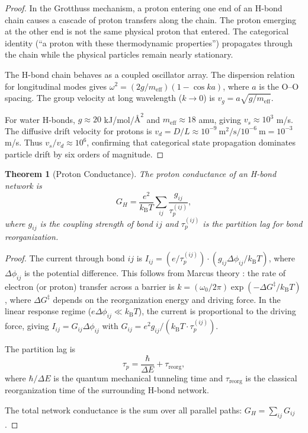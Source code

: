 \documentclass[twocolumn,10pt,a4paper]{article}
\newtheorem{theorem}{Theorem}[section]
\theoremstyle{definition}
\theoremstyle{remark}
\newcommand{\kB}{k_{\mathrm{B}}}
\newcommand{\taup}{\tau_p}
\begin{document}
\begin{proof}
In the Grotthuss mechanism, a proton entering one end of an H-bond chain causes a cascade of proton transfers along the chain. The proton emerging at the other end is not the same physical proton that entered. The categorical identity (``a proton with these thermodynamic properties'') propagates through the chain while the physical particles remain nearly stationary.

The H-bond chain behaves as a coupled oscillator array. The dispersion relation for longitudinal modes gives $\omega^2 = (2g/m_{\mathrm{eff}})(1 - \cos ka)$, where $a$ is the O--O spacing. The group velocity at long wavelength ($k \to 0$) is $v_g = a\sqrt{g/m_{\mathrm{eff}}}$.

For water H-bonds, $g \approx 20$ kJ/mol/$\text{\AA}^2$ and $m_{\mathrm{eff}} \approx 18$ amu, giving $v_s \approx 10^3$ m/s. The diffusive drift velocity for protons is $v_d = D/L \approx 10^{-9}~\mathrm{m}^2/\mathrm{s} / 10^{-6}~\mathrm{m} = 10^{-3}$ m/s. Thus $v_s/v_d \approx 10^6$, confirming that categorical state propagation dominates particle drift by six orders of magnitude.
\end{proof}

\begin{theorem}[Proton Conductance]
\label{thm:conductance}
The proton conductance of an H-bond network is
\begin{equation}
    G_H = \frac{e^2}{\kB T} \sum_{ij} \frac{g_{ij}}{\taup^{(ij)}},
    \label{eq:conductance}
\end{equation}
where $g_{ij}$ is the coupling strength of bond $ij$ and $\taup^{(ij)}$ is the partition lag for bond reorganization.
\end{theorem}

\begin{proof}
The current through bond $ij$ is $I_{ij} = (e/\taup^{(ij)}) \cdot (g_{ij} \Delta\phi_{ij} / \kB T)$, where $\Delta\phi_{ij}$ is the potential difference. This follows from Marcus theory \citep{Marcus1956}: the rate of electron (or proton) transfer across a barrier is $k = (\omega_0/2\pi) \exp(-\Delta G^\ddagger / \kB T)$, where $\Delta G^\ddagger$ depends on the reorganization energy and driving force. In the linear response regime ($e\Delta\phi_{ij} \ll \kB T$), the current is proportional to the driving force, giving $I_{ij} = G_{ij} \Delta\phi_{ij}$ with $G_{ij} = e^2 g_{ij} / (\kB T \cdot \taup^{(ij)})$.

The partition lag is
\begin{equation}
    \taup = \frac{\hbar}{\Delta E} + \tau_{\mathrm{reorg}},
    \label{eq:partition_lag}
\end{equation}
where $\hbar/\Delta E$ is the quantum mechanical tunneling time and $\tau_{\mathrm{reorg}}$ is the classical reorganization time of the surrounding H-bond network.

The total network conductance is the sum over all parallel paths: $G_H = \sum_{ij} G_{ij}$.
\end{proof}
\end{document}
